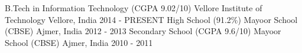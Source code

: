 \begin{cventries}
  \cventry
    {\small B.Tech in Information Technology (CGPA 9.02/10)}
    {Vellore Institute of Technology}
    {Vellore, India}
    {2014 - PRESENT}
  \cventry
    {\small High School (91.2\%)}
    {Mayoor School (CBSE)}
    {Ajmer, India}
    {2012 - 2013}
  \cventry
    {\small Secondary School (CGPA 9.6/10)}
    {Mayoor School (CBSE)}
    {Ajmer, India}
    {2010 - 2011}
\end{cventries}
